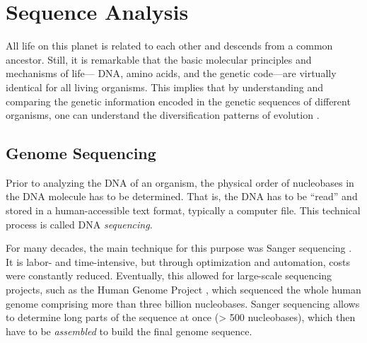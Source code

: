\section{Sequence Analysis}
\label{ch:Foundations:sec:SequenceAnalysis}

All life on this planet is related to each other and descends from a common ancestor.
Still, it is remarkable that the basic molecular principles and mechanisms of life---%
\ac{DNA}, amino acids, and the genetic code---are virtually identical for all living organisms.
This implies that by understanding and comparing the genetic information
encoded in the genetic sequences of different organisms,
one can understand the diversification patterns of evolution \cite{Zuckerkandl1965}.


\subsection{Genome Sequencing}
\label{ch:Foundations:sec:SequenceAnalysis:sub:GenomeSequencing}

Prior to analyzing the \ac{DNA} of an organism, the physical order of nucleobases in the \ac{DNA} molecule has to be determined.
That is, the \ac{DNA} has to be ``read'' and stored in a human-accessible text format, typically a computer file.
This technical process is called \ac{DNA} \emph{sequencing}.

For many decades, the main technique for this purpose was Sanger sequencing \cite{Sanger1975,Sanger1977}.
It is labor- and time-intensive, but through optimization and automation, costs were constantly reduced.
Eventually, this allowed for large-scale sequencing projects, such as the Human Genome Project \cite{Venter2001},
which sequenced the whole human genome comprising more than three billion nucleobases.
Sanger sequencing allows to determine long parts of the sequence at once (> \num{500} nucleobases),
which then have to be \emph{assembled} to build the final genome sequence.

